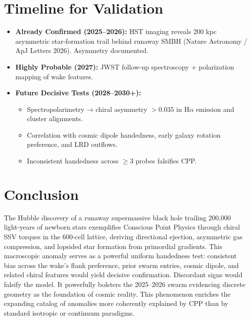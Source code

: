 \documentclass[11pt]{article}
\begin{document}
\section{Timeline for Validation}
\begin{itemize}
    \item \textbf{Already Confirmed (2025--2026):} HST imaging reveals 200 kpc asymmetric star-formation trail behind runaway SMBH (Nature Astronomy / ApJ Letters 2026). Asymmetry documented.
    \item \textbf{Highly Probable (2027):} JWST follow-up spectroscopy + polarization mapping of wake features.
    \item \textbf{Future Decisive Tests (2028--2030+):}
    \begin{itemize}
        \item Spectropolarimetry → chiral asymmetry $>0.035$ in H$\alpha$ emission and cluster alignments.
        \item Correlation with cosmic dipole handedness, early galaxy rotation preference, and LRD outflows.
        \item Inconsistent handedness across $\geq 3$ probes falsifies CPP.
    \end{itemize}
\end{itemize}

\section{Conclusion}
The Hubble discovery of a runaway supermassive black hole trailing 200,000 light-years of newborn stars exemplifies Conscious Point Physics through chiral SSV torques in the 600-cell lattice, deriving directional ejection, asymmetric gas compression, and lopsided star formation from primordial gradients.  
This macroscopic anomaly serves as a powerful uniform handedness test: consistent bias across the wake's flank preference, prior swarm entries, cosmic dipole, and related chiral features would yield decisive confirmation. Discordant signs would falsify the model. It powerfully bolsters the 2025--2026 swarm evidencing discrete geometry as the foundation of cosmic reality.  
This phenomenon enriches the expanding catalog of anomalies more coherently explained by CPP than by standard isotropic or continuum paradigms.
\end{document}
